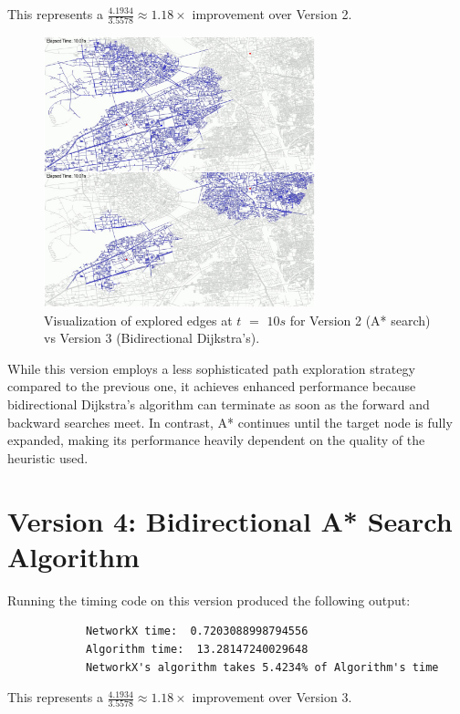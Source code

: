 		 This represents a \(\frac{4.1934}{3.5578} \approx 1.18\times\) improvement over Version 2. 
		 
		 \begin{figure}[H]
		 	\centering
		 	\includegraphics[width=0.7\textwidth]{astar_vs_bidijkstra.png}
		 	\caption{Visualization of explored edges at $t$ $=$ $10s$ for Version 2 (A* search) vs Version 3 (Bidirectional Dijkstra's).}
		 	\label{fig:bidirectional_dijkstra_vs_astar}
		 \end{figure}

		 While this version employs a less sophisticated path exploration strategy compared to the previous one, it achieves enhanced performance because bidirectional Dijkstra's algorithm can terminate as soon as the forward and backward searches meet. In contrast, A* continues until the target node is fully expanded, making its performance heavily dependent on the quality of the heuristic used.
	 
	 \section{Version 4: Bidirectional A* Search Algorithm}
	 	Running the timing code on this version produced the following output:
	 	\begin{verbatim}
	 		NetworkX time:  0.7203088998794556
	 		Algorithm time:  13.28147240029648
	 		NetworkX's algorithm takes 5.4234% of Algorithm's time
	 	\end{verbatim}
	 	
	 	This represents a \(\frac{4.1934}{3.5578} \approx 1.18\times\) improvement over Version 3. \newline \vspace{4mm}
	 	
